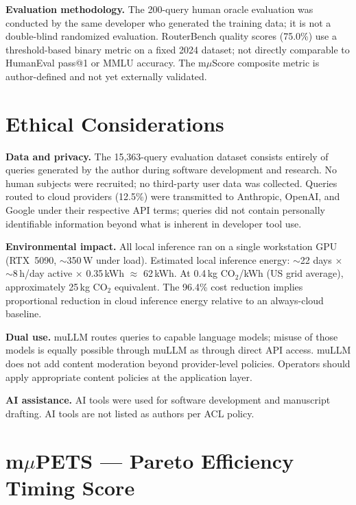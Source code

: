 \documentclass[11pt]{article}
\begin{document}
\textbf{Evaluation methodology.} The 200-query human oracle evaluation
was conducted by the same developer who generated the training data; it
is not a double-blind randomized evaluation. RouterBench quality scores
(75.0\%) use a threshold-based binary metric on a fixed 2024 dataset;
not directly comparable to HumanEval pass@1 or MMLU accuracy. The
m$\mu$Score composite metric is author-defined and not yet externally
validated.

\section*{Ethical Considerations}

\textbf{Data and privacy.} The 15,363-query evaluation dataset consists
entirely of queries generated by the author during software development
and research. No human subjects were recruited; no third-party user data
was collected. Queries routed to cloud providers (12.5\%) were
transmitted to Anthropic, OpenAI, and Google under their respective API
terms; queries did not contain personally identifiable information
beyond what is inherent in developer tool use.

\textbf{Environmental impact.} All local inference ran on a single
workstation GPU (RTX~5090, $\sim$350\,W under load). Estimated local
inference energy: $\sim$22 days $\times$ $\sim$8\,h/day active $\times$
0.35\,kWh $\approx$ 62\,kWh. At 0.4\,kg CO$_2$/kWh (US grid average),
approximately 25\,kg CO$_2$ equivalent. The 96.4\% cost reduction
implies proportional reduction in cloud inference energy relative to an
always-cloud baseline.

\textbf{Dual use.} muLLM routes queries to capable language models;
misuse of those models is equally possible through muLLM as through
direct API access. muLLM does not add content moderation beyond
provider-level policies. Operators should apply appropriate content
policies at the application layer.

\textbf{AI assistance.} AI tools were used for software development and
manuscript drafting. AI tools are not listed as authors per ACL policy.

\appendix

\section{m$\mu$PETS --- Pareto Efficiency Timing Score}
\end{document}

